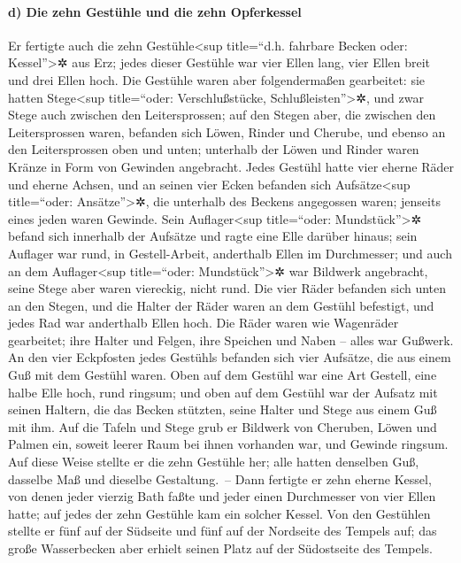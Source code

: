 \hypertarget{d-die-zehn-gestuxfchle-und-die-zehn-opferkessel}{%
\paragraph{d) Die zehn Gestühle und die zehn
Opferkessel}\label{d-die-zehn-gestuxfchle-und-die-zehn-opferkessel}}

Er fertigte auch die zehn Gestühle\textless sup
title=``d.h. fahrbare Becken oder: Kessel''\textgreater✲ aus Erz; jedes
dieser Gestühle war vier Ellen lang, vier Ellen breit und drei Ellen
hoch. Die Gestühle waren aber folgendermaßen gearbeitet:
sie hatten Stege\textless sup title=``oder: Verschlußstücke,
Schlußleisten''\textgreater✲, und zwar Stege auch zwischen den
Leitersprossen; auf den Stegen aber, die zwischen den
Leitersprossen waren, befanden sich Löwen, Rinder und Cherube, und
ebenso an den Leitersprossen oben und unten; unterhalb der Löwen und
Rinder waren Kränze in Form von Gewinden angebracht.
Jedes Gestühl hatte vier eherne Räder und eherne Achsen,
und an seinen vier Ecken befanden sich Aufsätze\textless sup
title=``oder: Ansätze''\textgreater✲, die unterhalb des Beckens
angegossen waren; jenseits eines jeden waren Gewinde.
Sein Auflager\textless sup title=``oder:
Mundstück''\textgreater✲ befand sich innerhalb der Aufsätze und ragte
eine Elle darüber hinaus; sein Auflager war rund, in Gestell-Arbeit,
anderthalb Ellen im Durchmesser; und auch an dem Auflager\textless sup
title=``oder: Mundstück''\textgreater✲ war Bildwerk angebracht, seine
Stege aber waren viereckig, nicht rund. Die vier Räder
befanden sich unten an den Stegen, und die Halter der Räder waren an dem
Gestühl befestigt, und jedes Rad war anderthalb Ellen hoch.
Die Räder waren wie Wagenräder gearbeitet; ihre Halter
und Felgen, ihre Speichen und Naben -- alles war Gußwerk.
An den vier Eckpfosten jedes Gestühls befanden sich vier
Aufsätze, die aus einem Guß mit dem Gestühl waren. Oben
auf dem Gestühl war eine Art Gestell, eine halbe Elle hoch, rund
ringsum; und oben auf dem Gestühl war der Aufsatz mit seinen Haltern,
die das Becken stützten, seine Halter und Stege aus einem Guß mit ihm.
Auf die Tafeln und Stege grub er Bildwerk von Cheruben,
Löwen und Palmen ein, soweit leerer Raum bei ihnen vorhanden war, und
Gewinde ringsum. Auf diese Weise stellte er die zehn
Gestühle her; alle hatten denselben Guß, dasselbe Maß und dieselbe
Gestaltung.~-- Dann fertigte er zehn eherne Kessel, von
denen jeder vierzig Bath faßte und jeder einen Durchmesser von vier
Ellen hatte; auf jedes der zehn Gestühle kam ein solcher Kessel.
Von den Gestühlen stellte er fünf auf der Südseite und
fünf auf der Nordseite des Tempels auf; das große Wasserbecken aber
erhielt seinen Platz auf der Südostseite des Tempels.


